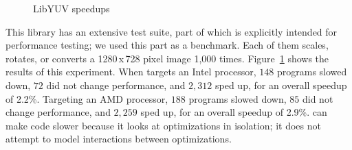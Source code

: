 \begin{figure}[tbp]
  \centering
  \hfill
  \caption{LibYUV speedups}
  \label{fig:yuv}
\end{figure}


This library has an extensive test suite, part of which is explicitly
intended for performance testing; we used this part as a benchmark.
%
Each of them scales, rotates, or converts a 1280\,x\,728 pixel
image 1,000 times.
%
Figure~\ref{fig:yuv} shows the results of this experiment.
%
When \minotaur{} targets an Intel processor, $148$ programs slowed down, $72$
did not change performance, and $2,312$ sped up, for an overall speedup of
2.2\%.
%
Targeting an AMD processor, $188$ programs slowed down, $85$ did not
change performance, and $2,259$ sped up, for an overall speedup of 2.9\%.
%
\minotaur{} can make code slower because it looks at optimizations in
isolation; it does not attempt to model interactions between
optimizations.


